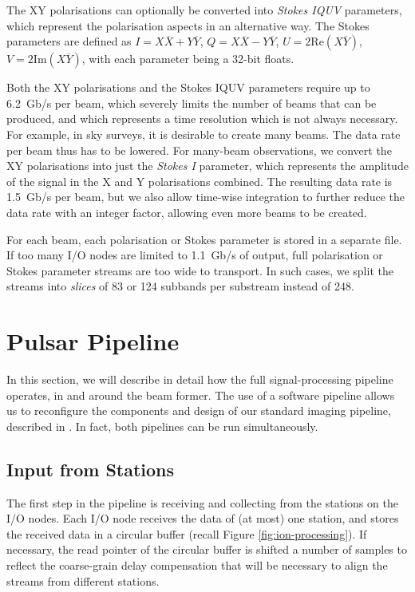 \documentclass{llncs}
\begin{document}
The XY polarisations can optionally be converted into \emph{Stokes IQUV} parameters, which represent the polarisation aspects in an alternative way. The Stokes parameters are defined as $I = X\overline{X} + Y\overline{Y}$, $Q = X\overline{X} - Y\overline{Y}$, $U = 2\mathrm{Re}(X\overline{Y})$, $V = 2\mathrm{Im}(X\overline{Y})$, with each parameter being a 32-bit floats.

Both the XY polarisations and the Stokes IQUV parameters require up to 6.2~Gb/s per beam, which severely limits the number of beams that can be produced, and which represents a time resolution which is not always necessary. For example, in sky surveys, it is desirable to create many beams. The data rate per beam thus has to be lowered. For many-beam observations, we convert the XY polarisations into just the \emph{Stokes I} parameter, which represents the amplitude of the signal in the X and Y polarisations combined. The resulting data rate is 1.5~Gb/s per beam, but we also allow time-wise integration to further reduce the data rate with an integer factor, allowing even more beams to be created.

For each beam, each polarisation or Stokes parameter is stored in a separate file. If too many I/O nodes are limited to 1.1~Gb/s of output, full polarisation or Stokes parameter streams are too wide to transport. In such cases, we split the streams into \emph{slices} of 83 or 124 subbands per substream instead of 248.

\section{Pulsar Pipeline}


In this section, we will describe in detail how the full signal-processing pipeline operates, in and around the beam former. The use of a software pipeline allows us to reconfigure the components and design of our standard imaging pipeline, described in \cite{Romein:10a}. In fact, both pipelines can be run simultaneously.

\subsection{Input from Stations}
The first step in the pipeline is receiving and collecting from the stations on the I/O nodes. Each I/O node receives the data of (at most) one station, and stores the received data in a circular buffer (recall Figure \ref{fig:ion-processing}). If necessary, the read pointer of the circular buffer is shifted a number of samples to reflect the coarse-grain delay compensation that will be necessary to align the streams from different stations.
\end{document}
